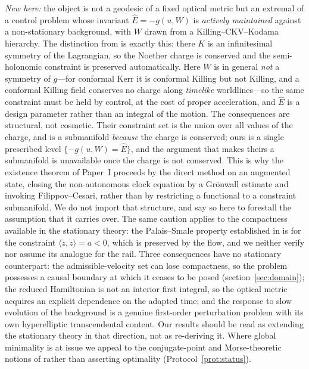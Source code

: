 \documentclass[12pt]{iopart}
\theoremstyle{plain}
\theoremstyle{definition}
\theoremstyle{remark}
\newcommand{\Ehat}{\hat E}
\begin{document}
\emph{New here:} the object is not a geodesic of a fixed optical metric but an extremal of
a control problem whose invariant $\Ehat=-g(u,W)$ is \emph{actively maintained} against a
non-stationary background, with $W$ drawn from a Killing--CKV--Kodama hierarchy. The
distinction from \cite{CaponioCoronaGiamboPiccione2024} is exactly this: there $K$ is an
infinitesimal symmetry of the Lagrangian, so the Noether charge is conserved and the
semi-holonomic constraint is preserved automatically. Here $W$ is in general \emph{not} a
symmetry of $g$---for conformal Kerr it is conformal Killing but not Killing, and a
conformal Killing field conserves no charge along \emph{timelike} worldlines---so the
same constraint must be held by control, at the cost of proper acceleration, and $\Ehat$
is a design parameter rather than an integral of the motion. The consequences are
structural, not cosmetic. Their constraint set is the union over all values of the
charge, and is a submanifold \emph{because} the charge is conserved; ours is a single
prescribed level $\{-g(u,W)=\Ehat\}$, and the argument that makes theirs a submanifold is
unavailable once the charge is not conserved. This is why the existence theorem of
Paper~I proceeds by the direct method on an augmented state, closing the non-autonomous
clock equation by a Gr\"onwall estimate and invoking Filippov--Cesari, rather than by
restricting a functional to a constraint submanifold. We do not import that structure,
and say so here to forestall the assumption that it carries over. The same caution
applies to the compactness available in the stationary theory: the Palais--Smale property
established in \cite{GiannoniMasielloPiccione1998} is for the constraint
$\langle\dot z,\dot z\rangle=a<0$, which is preserved by the flow, and we neither verify
nor assume its analogue for the rail.
Three
consequences have no stationary counterpart: the admissible-velocity set can lose
compactness, so the problem possesses a causal boundary at which it ceases to be posed
(section~\ref{sec:domain}); the reduced Hamiltonian is not an interior first integral, so
the optical metric acquires an explicit dependence on the adapted time; and the response to
slow evolution of the background is a genuine first-order perturbation problem with its own
hyperelliptic transcendental content. Our results should be read as extending the
stationary theory in that direction, not as re-deriving it. Where global minimality is at
issue we appeal to the conjugate-point and Morse-theoretic notions of
\cite{GiannoniPiccioneTausk2002} rather than asserting optimality
(Protocol~\ref{prot:status}).
\end{document}
